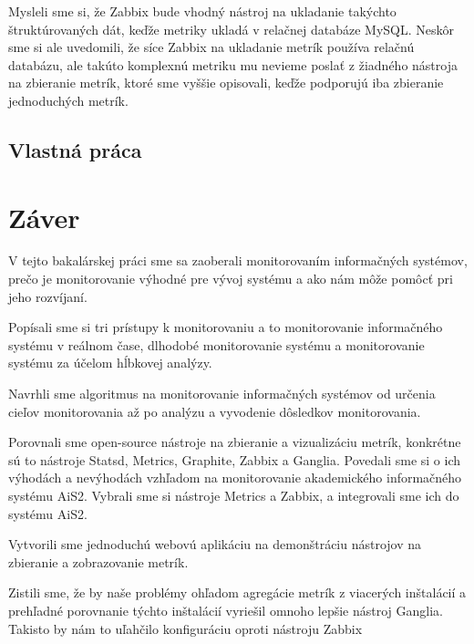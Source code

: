 \documentclass[a4paper, upjsfrontpage, thesismargins, thesislinespacing]{rnthesis}
\begin{document}
Mysleli sme si, že Zabbix bude vhodný nástroj na ukladanie takýchto štruktúrovaných dát, keďže metriky ukladá v relačnej databáze MySQL.
Neskôr sme si ale uvedomili, že síce Zabbix na ukladanie metrík používa relačnú databázu, ale takúto komplexnú metriku mu nevieme poslať z žiadného nástroja na zbieranie metrík, ktoré sme vyššie opisovali, keďže podporujú iba zbieranie jednoduchých metrík.



\section{Vlastná práca}

\newpage


\chapter*{Záver}

V tejto bakalárskej práci sme sa zaoberali monitorovaním informačných systémov, prečo je monitorovanie výhodné pre vývoj systému a ako nám môže pomôcť pri jeho rozvíjaní.

Popísali sme si tri prístupy k monitorovaniu a to monitorovanie informačného systému v reálnom čase, dlhodobé monitorovanie systému a monitorovanie systému za účelom hĺbkovej analýzy.

Navrhli sme algoritmus na monitorovanie informačných systémov od určenia cieľov monitorovania až po analýzu a vyvodenie dôsledkov monitorovania.

Porovnali sme open-source nástroje na zbieranie a vizualizáciu metrík, konkrétne sú to nástroje Statsd, Metrics, Graphite, Zabbix a Ganglia.
Povedali sme si o ich výhodách a nevýhodách vzhľadom na monitorovanie akademického informačného systému AiS2.
Vybrali sme si nástroje Metrics a Zabbix, a integrovali sme ich do systému AiS2.

Vytvorili sme jednoduchú webovú aplikáciu na demonštráciu nástrojov na zbieranie a zobrazovanie metrík.

Zistili sme, že by naše problémy ohľadom agregácie metrík z viacerých inštalácií a prehľadné porovnanie týchto inštalácií vyriešil omnoho lepšie nástroj Ganglia.
Takisto by nám to uľahčilo konfiguráciu oproti nástroju Zabbix
\end{document}
